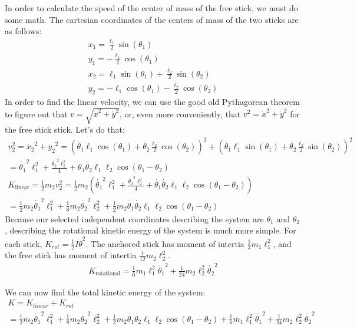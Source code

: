 \documentclass[]{article}
\begin{document}
In order to calculate the speed of the center of mass of the free stick, we must do some math. The cartesian coordinates of the centers of mass of the two sticks are as follows:
\begin{gather*}
x_1 = \frac{\ell_1}{2}\sin(\theta_1) \\
y_1 = -\frac{\ell_1}{2}\cos(\theta_1) \\
x_2 = \ell_1\sin(\theta_1) + \frac{\ell_2}{2}\sin(\theta_2) \\
y_2 = -\ell_1\cos(\theta_1) - \frac{\ell_2}{2}\cos(\theta_2)
\end{gather*}
In order to find the linear velocity, we can use the good old Pythagorean theorem to figure out that $v = \sqrt{\dot{x}^2 + \dot{y}^2}$, or, even more conveniently, that $v^2 = \dot{x}^2 + \dot{y}^2$ for the free stick stick. Let's do that:
\begin{gather*}
	v_2^2 = \dot{x_2}^2 + \dot{y_2}^2 = (\dot{\theta_1}\ell_1\cos(\theta_1) + \dot{\theta_2}\frac{\ell_2}{2}\cos(\theta_2))^2 + (\dot{\theta_1}\ell_1\sin(\theta_1) + \dot{\theta_2}\frac{\ell_2}{2}\sin(\theta_2))^2 \\
	= \dot{\theta_1}^2\ell_1^2 + \frac{\dot{\theta_2}^2\ell_2^2}{4} + \dot{\theta_1}\dot{\theta_2}\ell_1\ell_2\cos(\theta_1 - \theta_2) \\
	K_{\text{linear}} = \frac12m_2v_2^2 = \frac12m_2(\dot{\theta_1}^2\ell_1^2 + \frac{\dot{\theta_2}^2\ell_2^2}{4} + \dot{\theta_1}\dot{\theta_2}\ell_1\ell_2\cos(\theta_1 - \theta_2)) \\
	= \frac12m_2\dot{\theta_1}^2\ell_1^2 + \frac18m_2\dot{\theta_2}^2\ell_2^2 + \frac12m_2\dot{\theta_1}\dot{\theta_2}\ell_1\ell_2\cos(\theta_1 - \theta_2)
\end{gather*}
Because our selected independent coordinates describing the system are $\theta_1$ and $\theta_2$, describing the rotational kinetic energy of the system is much more simple. For each stick, $K_{rot} = \frac12 I \dot{\theta}^2$. The anchored stick has moment of intertia $\frac13m_1\ell_1^2$, and the free stick has moment of intertia $\frac{1}{12}m_2\ell_2^2$.
\begin{gather*}
	K_{\text{rotational}} = \frac16m_1\ell_1^2\dot{\theta_1}^2 + \frac{1}{24}m_2\ell_2^2\dot{\theta_2}^2
\end{gather*}

We can now find the total kinetic energy of the system:
\begin{gather*}
	K = K_{linear} + K_{rot} \\
	= \frac12m_2\dot{\theta_1}^2\ell_1^2 + \frac18m_2\dot{\theta_2}^2\ell_2^2 + \frac12m_2\dot{\theta_1}\dot{\theta_2}\ell_1\ell_2\cos(\theta_1 - \theta_2) + \frac16m_1\ell_1^2\dot{\theta_1}^2 + \frac{1}{24}m_2\ell_2^2\dot{\theta_2}^2
\end{gather*}
\end{document}
